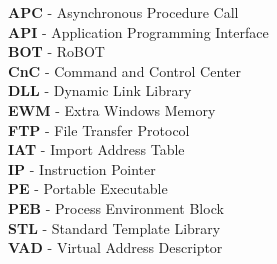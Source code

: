 \textbf{APC} - Asynchronous Procedure Call \\
\textbf{API} - Application Programming Interface \\
\textbf{BOT} - RoBOT \\
\textbf{CnC} - Command and Control Center \\
\textbf{DLL} - Dynamic Link Library \\
\textbf{EWM} - Extra Windows Memory \\
\textbf{FTP} - File Transfer Protocol \\
\textbf{IAT} - Import Address Table \\
\textbf{IP}  - Instruction Pointer \\
\textbf{PE}	 - Portable Executable \\
\textbf{PEB} - Process Environment Block \\
\textbf{STL} - Standard Template Library \\
\textbf{VAD} - Virtual Address Descriptor \\